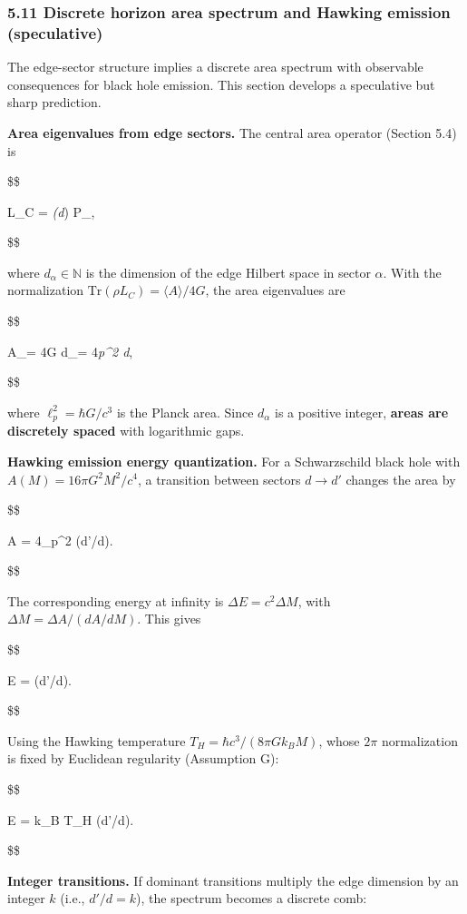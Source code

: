 \documentclass[11pt,a4paper]{article}
\theoremstyle{remark}
\begin{document}
\subsubsection{5.11 Discrete horizon area spectrum and Hawking emission (speculative)}\label{discrete-horizon-area-spectrum-and-hawking-emission-speculative}

The edge-sector structure implies a discrete area spectrum with observable
consequences for black hole emission. This section develops a speculative but
sharp prediction.

\textbf{Area eigenvalues from edge sectors.} The central area operator (Section 5.4)
is

\$\$

L\_C = \sum\emph{\alpha (\log d}\alpha) P\_\alpha,

\$\$

where \(d_\alpha \in \mathbb{N}\) is the dimension of the edge Hilbert space in
sector \(\alpha\). With the normalization \(\mathrm{Tr}(\rho L_C) = \langle A
\rangle / 4G\), the area eigenvalues are

\$\$

A\_\alpha = 4G \log d\_\alpha = 4\ell\emph{p\^{}2 \ln d}\alpha,

\$\$

where \(\ell_p^2 = \hbar G/c^3\) is the Planck area. Since \(d_\alpha\) is a
positive integer, \textbf{areas are discretely spaced} with logarithmic gaps.

\textbf{Hawking emission energy quantization.} For a Schwarzschild black hole with
\(A(M) = 16\pi G^2 M^2/c^4\), a transition between sectors \(d \to d'\) changes
the area by

\$\$

\Delta A = 4\ell\_p\^{}2 \ln(d'/d).

\$\$

The corresponding energy at infinity is \(\Delta E = c^2 \Delta M\), with
\(\Delta M = \Delta A / (dA/dM)\). This gives

\$\$

\Delta E =  \ln(d'/d).

\$\$

Using the Hawking temperature \(T_H = \hbar c^3 / (8\pi G k_B M)\), whose
\(2\pi\) normalization is fixed by Euclidean regularity (Assumption G):

\$\$

\Delta E = k\_B T\_H \ln(d'/d).

\$\$

\textbf{Integer transitions.} If dominant transitions multiply the edge dimension
by an integer \(k\) (i.e., \(d'/d = k\)), the spectrum becomes a discrete comb:
\end{document}
